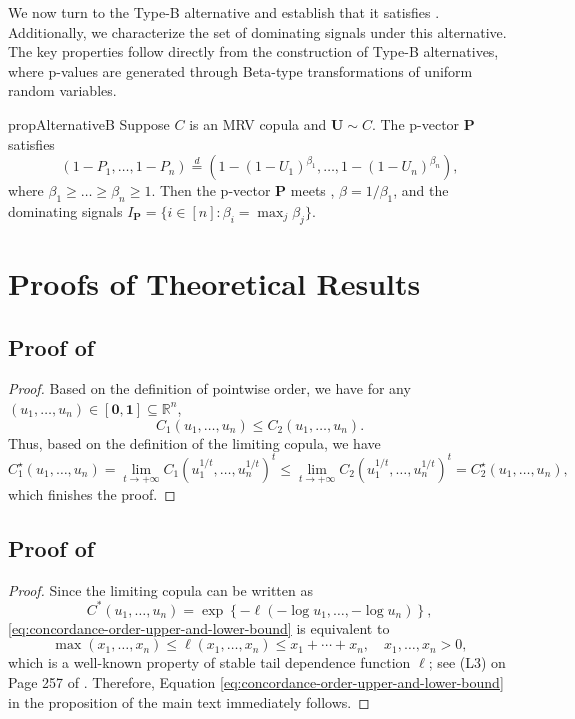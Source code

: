 \documentclass[12pt]{article}
\theoremstyle{plain}
\theoremstyle{plain}
\theoremstyle{definition}
\begin{document}
We now turn to the Type-B alternative and establish that it satisfies . Additionally, we characterize the set of dominating signals under this alternative. The key properties follow directly from the construction of Type-B alternatives, where p-values are generated through Beta-type transformations of uniform random variables.
\begin{restatable}{prop}{AlternativeB}
\label{prop:alternative-b}
Suppose $C$ is an MRV copula and $\mathbf{U}\sim C$. The p-vector $\mathbf{P}$ satisfies
\[
    (1-P_1,\dots,1-P_n) \overset{d}{=} (1-(1-U_1)^{\beta_1},\dots,1-(1-U_n)^{\beta_n}),
\]
where $\beta_1\ge\dots\ge\beta_n\ge1$. Then the p-vector $\mathbf{P}$ meets , $\beta=1/\beta_1$, and the dominating signals $I_{\mathbf{P}}=\{i\in[n]:\beta_i=\max_j\beta_j\}$.
\end{restatable}


\section{Proofs of Theoretical Results}
\subsection{Proof of }
\Limitorder*
\begin{proof}
    Based on the definition of pointwise order, we have for any $(u_1,\dots, u_n)\in [\bm 0, \bm 1]\subseteq\mathbb{R}^n$,
    $$C_1(u_1, \dots, u_n)\leq C_2(u_1,\dots, u_n).$$
    Thus, based on the definition of the limiting copula, we have 
    $$C_1^\star(u_1, \dots, u_n)=\lim_{t\to+\infty}C_1(u_1^{1/t},\dots, u_n^{1/t})^t\leq \lim_{t\to+\infty}C_2(u_1^{1/t},\dots, u_n^{1/t})^t = C_2^\star(u_1, \dots, u_n),$$
    which finishes the proof.
\end{proof}

\subsection{Proof of }
\label{subsec:proof-concordance-order-upper-and-lower-bound}
\ConcordanceOrder*
\begin{proof}
Since the limiting copula can be written as
\[
C^*(u_1,\dots,u_n)=\exp\left\{-\ell(-\log u_1,\dots,-\log u_n)\right\},
\]
\eqref{eq:concordance-order-upper-and-lower-bound} is equivalent to
\begin{equation}
\label{eq:concordance-order-by-l}
\max(x_1,\dots,x_n)\le \ell(x_1,\dots,x_n)\le x_1+\cdots+x_n,\quad x_1,\dots,x_n>0,
\end{equation}
which is a well-known property of stable tail dependence function $\ell$; see (L3) on Page 257 of .
Therefore, Equation \eqref{eq:concordance-order-upper-and-lower-bound} in the proposition of the main text immediately follows.
\end{proof}
\end{document}

